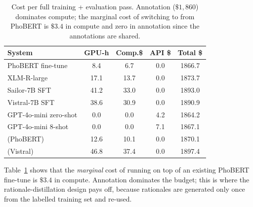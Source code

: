 \begin{table}[t]
\centering
\footnotesize
\begin{tabular}{@{}lcccc@{}}
\toprule
System & GPU-h & Comp.\$ & API \$ & Total \$ \\
\midrule
PhoBERT fine-tune        &  8.4 &  6.7 &  0.0 & 1866.7 \\
XLM-R-large              & 17.1 & 13.7 &  0.0 & 1873.7 \\
Sailor-7B SFT            & 41.2 & 33.0 &  0.0 & 1893.0 \\
Vistral-7B SFT           & 38.6 & 30.9 &  0.0 & 1890.9 \\
GPT-4o-mini zero-shot    &  0.0 &  0.0 &  4.2 & 1864.2 \\
GPT-4o-mini 8-shot       &  0.0 &  0.0 &  7.1 & 1867.1 \\
\method{} (PhoBERT)      & 12.6 & 10.1 &  0.0 & 1870.1 \\
\method{} (Vistral)      & 46.8 & 37.4 &  0.0 & 1897.4 \\
\bottomrule
\end{tabular}
\caption{Cost per full \method{} training + evaluation pass. Annotation
($\$1{,}860$) dominates compute; the marginal cost of switching to
\method{} from PhoBERT is $\$3.4$ in compute and zero in annotation
since the annotations are shared.}
\label{tab:cost}
\end{table}

Table~\ref{tab:cost} shows that the \emph{marginal} cost of running
\method{} on top of an existing PhoBERT fine-tune is $\$3.4$ in
compute. Annotation dominates the budget; this is where the
rationale-distillation design pays off, because rationales are
generated only once from the labelled training set and re-used.
